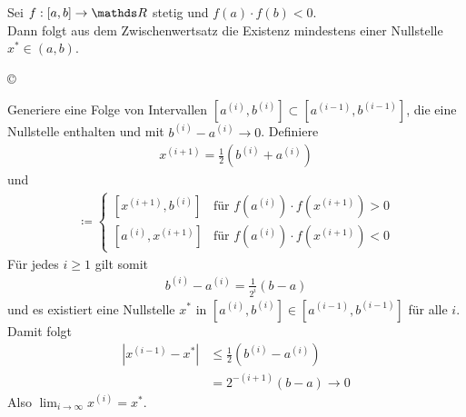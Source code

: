 Sei $f:[a,b]\rightarrow \R $ stetig und $f(a) \cdot f(b) <0$.\\
Dann folgt aus dem Zwischenwertsatz die Existenz
mindestens einer Nullstelle $x^{*}\in (a,b)$.\\

\begin{image}{\copyright}
\end{image}\label{im5.1.2}

Generiere eine Folge von Intervallen
$[a^{(i)}, b^{(i)}]\subset  [a^{(i-1)}, b^{(i-1)}] $,
die eine Nullstelle enthalten und mit $b^{(i)}-a^{(i)} \longrightarrow 0$.
Definiere
\begin{gather}
  x^{(i+1)}= \frac{1}{2}(b^{(i)}+a^{(i)})
  \label{V.1.1}
\end{gather}
und
\begin{gather}
  [a^{(i+1)}, b^{(i+1)}] \coloneqq \begin{cases}
    [x^{(i+1)}, b^{(i)}] & \text{für } f(a^{(i)})\cdot f(x^{(i+1)}) > 0 \\
    [a^{(i)}, x^{(i+1)}] & \text{für } f(a^{(i)})\cdot f(x^{(i+1)}) < 0
  \end{cases}
  \label{V.1.2}
\end{gather}
Für jedes $i\geq 1$ gilt somit
\begin{gather*}
  b^{(i)}-a^{(i)} = \frac{1}{2^i}(b-a)
\end{gather*}
und es existiert eine Nullstelle $x^{*}$ in $[a^{(i)}, b^{(i)}]\in  [a^{(i-1)}, b^{(i-1)}] $
für alle $i$. \\
Damit folgt
\begin{align*}
  |x^{(i-1)}-x^{*}| &\leq \frac{1}{2}(b^{(i)}-a^{(i)}) \\
                    &=  2^{-(i+1)} (b-a) \longrightarrow 0
\end{align*}
Also $\lim_{i\rightarrow \infty}x^{(i)} = x^{*}$.


